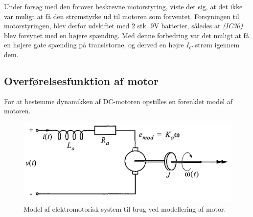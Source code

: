 Under forsøg med den forover beskrevne motorstyring, viste det sig, at det ikke var muligt at få den strømstyrke ud til motoren som forventet.
Forsyningen til motorstyringen, blev derfor udskiftet med 2 stk. 9V batterier, således at \emph{(IC30)} blev forsynet med en højere spænding.
Med denne forbedring var det muligt at få en højere gate spænding på transistorne, og derved en højre $I_C$ strøm igennem dem.
 
\subsection{Overførelsesfunktion af motor}
For at bestemme dynamikken af DC-motoren opstilles en forenklet model af motoren.

\begin{figure}[h!]
	\centering
	\includegraphics[width=.6\textwidth]{billeder/motor_model.png}
	\caption[Model af elektromotorisk system til brug ved modellering af motor]{Model af elektromotorisk system til brug ved modellering af motor\protect\footnotemark.}
	\label{fig:motor_model}
\end{figure}
\FloatBlock
{}

